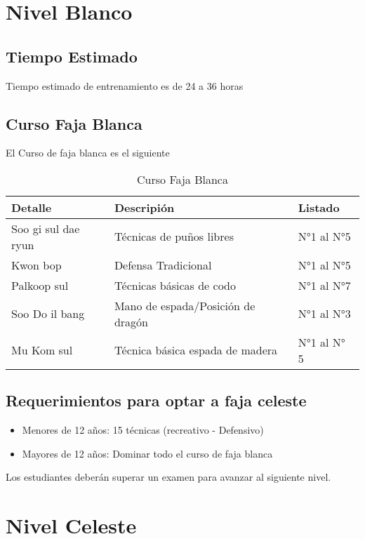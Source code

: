 \section{Nivel Blanco}


\subsection[Duración]{Tiempo Estimado}
Tiempo estimado de entrenamiento es de 24 a 36 horas

\subsection{Curso Faja Blanca}
El Curso de faja blanca es el siguiente

\begin{table}[t]
	\caption{Curso Faja Blanca}
	\begin{center}
		\begin{tabular}{ | m{2cm} | m{5cm} | m{5cm} | }
			\hline Detalle & Descripión & Listado\\ \hline
			Soo gi sul dae ryun & Técnicas de puños libres & N°1 al N°5\\
			Kwon bop & Defensa Tradicional & N°1 al N°5\\
			Palkoop sul & Técnicas básicas de codo & N°1 al N°7\\
			Soo Do il bang & Mano de espada/Posición de dragón & N°1 al N°3\\
			Mu Kom sul & Técnica básica espada de madera & N°1 al N° 5\\ \hline
		\end{tabular}
	\end{center}
\end{table}


\subsection{Requerimientos para optar a faja celeste}

\begin{itemize}
	\item Menores de 12 años: 15 técnicas (recreativo - Defensivo)
	\item Mayores de 12 años: Dominar todo el curso de faja blanca
\end{itemize}



Los estudiantes deberán superar un examen para avanzar al siguiente nivel.

\section{Nivel Celeste}

